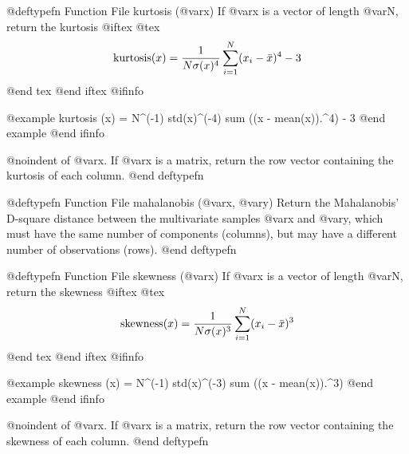 @deftypefn {Function File} {} kurtosis (@var{x})
If @var{x} is a vector of length @var{N}, return the kurtosis
@iftex
@tex
$$
 {\rm kurtosis} (x) = {1\over N \sigma(x)^4} \sum_{i=1}^N (x_i-\bar{x})^4 - 3
$$
@end tex
@end iftex
@ifinfo

@example
kurtosis (x) = N^(-1) std(x)^(-4) sum ((x - mean(x)).^4) - 3
@end example
@end ifinfo

@noindent
of @var{x}.  If @var{x} is a matrix, return the row vector containing
the kurtosis of each column.
@end deftypefn

@deftypefn {Function File} {} mahalanobis (@var{x}, @var{y})
Return the Mahalanobis' D-square distance between the multivariate
samples @var{x} and @var{y}, which must have the same number of
components (columns), but may have a different number of observations
(rows).
@end deftypefn

@deftypefn {Function File} {} skewness (@var{x})
If @var{x} is a vector of length @var{N}, return the skewness
@iftex
@tex
$$
{\rm skewness} (x) = {1\over N \sigma(x)^3} \sum_{i=1}^N (x_i-\bar{x})^3
$$
@end tex
@end iftex
@ifinfo

@example
skewness (x) = N^(-1) std(x)^(-3) sum ((x - mean(x)).^3)
@end example
@end ifinfo

@noindent
of @var{x}.  If @var{x} is a matrix, return the row vector containing
the skewness of each column.
@end deftypefn
